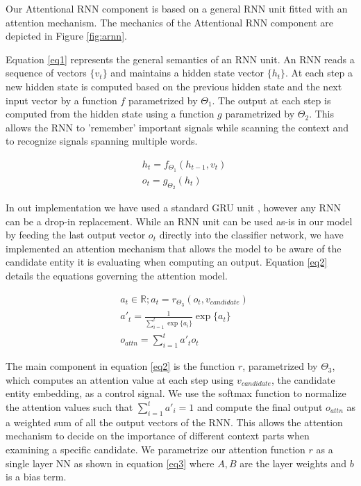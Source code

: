 \documentclass[11pt]{article}
\begin{document}
Our Attentional RNN component is based on a general RNN unit fitted with an attention mechanism. The mechanics of the Attentional RNN component are depicted in Figure \ref{fig:arnn}. 
	
Equation \ref{eq1} represents the general semantics of an RNN unit. An RNN reads a sequence of vectors $\{v_t\}$ and maintains a hidden state vector $\{h_t\}$. At each step a new hidden state is computed based on the previous hidden state and the next input vector by a function $f$ parametrized by $\Theta_1$. The output at each step is computed from the hidden state using a function $g$ parametrized by $\Theta_2$. This allows the RNN to 'remember' important signals while scanning the context and to recognize signals spanning multiple words.

\begin{equation}
\label{eq1}
\begin{aligned}
& h_t=f_{\Theta_1}(h_{t-1}, v_t) \\
& o_t=g_{\Theta_2}(h_t)
\end{aligned}
\end{equation}

In out implementation we have used a standard GRU unit \cite{cho2014learning}, however any RNN can be a drop-in replacement. While an RNN unit can be used as-is in our model by feeding the last output vector $o_t$ directly into the classifier network, we have implemented an attention mechanism that allows the model to be aware of the candidate entity it is evaluating when computing an output. Equation \ref{eq2} details the equations governing the attention model.

\begin{equation}
\label{eq2}
\begin{aligned}
& a_t \in \mathbb{R}; a_t=r_{\Theta_3}(o_t, v_{candidate}) \\
& a'_t  = \frac{1}{\sum_{i=1}^{t} \exp\{a_i\}} \exp \{a_t\} \\
& o_{attn}=\sum_{i=1}^{t} a'_t o_t
\end{aligned}
\end{equation}

The main component in equation \ref{eq2} is the function $r$, parametrized by $\Theta_3$, which computes an attention value at each step using $v_{candidate}$, the candidate entity embedding, as a control signal. We use the softmax function to normalize the attention values such that $\sum_{i=1}^{t} a'_i = 1$ and compute the final output $o_{attn}$ as a weighted sum of all the output vectors of the RNN. This allows the attention mechanism to decide on the importance of different context parts when examining a specific candidate. We parametrize our attention function $r$ as a single layer NN as shown in equation \ref{eq3} where $A, B$ are the layer weights and $b$ is a bias term.
\end{document}
